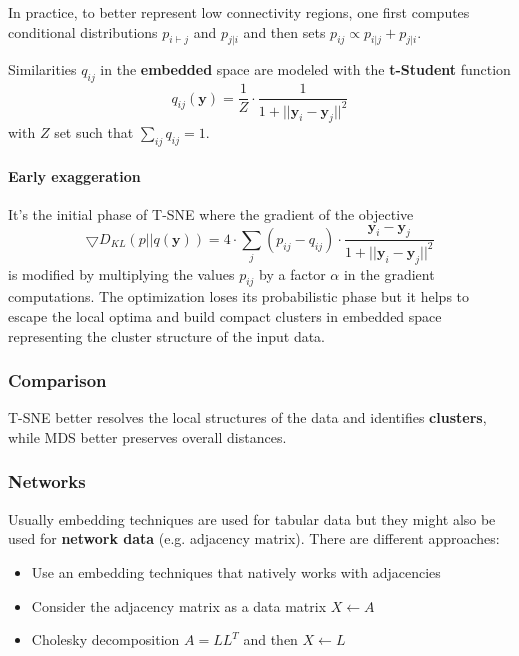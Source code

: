 \begin{note}
	In practice, to better represent low connectivity regions, one first computes conditional distributions $p_{i \vdash j}$ and $p_{j \vert i}$ and then sets $p_{ij} \propto p_{i \vert j} + p_{j \vert i}$.
\end{note}
Similarities $q_{ij}$ in the \textbf{embedded} space are modeled with the \textbf{t-Student} function
\begin{equation}
	q_{ij}(\mathbf{y}) = \frac{1}{Z} \cdot \frac{1}{1+ \lvert\lvert \mathbf{y}_i - \mathbf{y}_j \rvert\rvert^2}
\end{equation}
with $Z$ set such that $\sum_{ij}q_{ij}=1$.

\paragraph{Early exaggeration} It's the initial phase of T-SNE where the gradient of the objective
\begin{equation}
	\bigtriangledown D_{KL}(p \vert\vert q(\mathbf{y})) = 4 \cdot \sum_{j}(p_{ij}-q_{ij})\cdot \frac{\mathbf{y}_i - \mathbf{y}_j}{1+\lvert\lvert \mathbf{y}_i - \mathbf{y}_j\rvert\rvert^2}
\end{equation}
is modified by multiplying the values $p_{ij}$ by a factor $\alpha$ in the gradient computations. The optimization loses its probabilistic phase but it helps to escape the local optima and build compact clusters in embedded space representing	 the cluster structure of the input data.

\subsubsection{Comparison}
T-SNE better resolves the local structures of the data and identifies \textbf{clusters}, while MDS better preserves overall distances.
\begin{figure}[!h]
	\hfill
	\hfill
	\hfill
\end{figure}

\subsubsection{Networks}
Usually embedding techniques are used for tabular data but they might also be used for \textbf{network data} (e.g. adjacency matrix). There are different approaches:
\begin{itemize}
	\item Use an embedding techniques that natively works with adjacencies
	\item Consider the adjacency matrix as a data matrix $X \leftarrow A$
	\item Cholesky decomposition $A = LL^T$ and then $X \leftarrow L$
\end{itemize}

